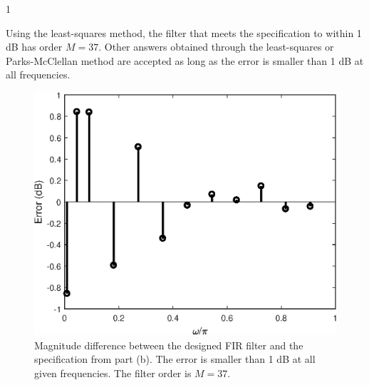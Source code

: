 \documentclass[10pt]{article}
\def\SOLUTIONS{0} %
\def\SolutionsColor{red2}
\begin{document}
\begin{enumerate}[label=(\alph*)]
	\if\SOLUTIONS1
	{\color{\SolutionsColor} Using the least-squares method, the filter that meets the specification to within 1 dB has order $M = 37$. Other answers obtained through the least-squares or Parks-McClellan method are accepted as long as the error is smaller than 1 dB at all frequencies.
		
		\FloatBarrier
		\begin{figure}[h!]
			\centering
			\includegraphics[scale=0.6]{figs/hearing_aid_filter_error.eps}
			\caption{Magnitude difference between the designed FIR filter and the specification from part (b). The error is smaller than 1 dB at all given frequencies. The filter order is $M = 37$.}
		\end{figure}
		\FloatBarrier	
		
}
\end{enumerate}
\end{document}
